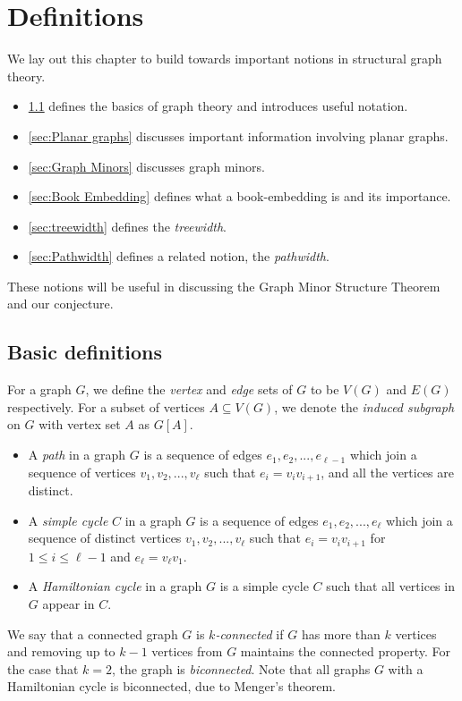\chapter{Definitions}\label{chap:Definitions}
We lay out this chapter to build towards important notions in structural graph theory.
\begin{itemize}
	\item \cref{sec: Basic definitions} defines the basics of graph theory and introduces useful notation.
	\item \cref{sec:Planar graphs} discusses important information involving planar graphs. 
	\item \cref{sec:Graph Minors} discusses graph minors.
	\item \cref{sec:Book Embedding} defines what a book-embedding is and its importance. 
	\item \cref{sec:treewidth} defines the \textit{treewidth}.
	\item \cref{sec:Pathwidth} defines a related notion, the \textit{pathwidth}.
\end{itemize}
These notions will be useful in discussing the Graph Minor Structure Theorem and our conjecture. 
\section{Basic definitions}\label{sec: Basic definitions}
For a graph $G$, we define the \textit{vertex} and \textit{edge} sets of $G$ to be $V(G)$ and $E(G)$ respectively.
For a subset of vertices $A \subseteq V(G)$, we denote the \textit{induced subgraph} on $G$ with vertex set $A$ as $G[A]$. 

\begin{itemize}
	\item A \textit{path} in a graph $G$ is a sequence of edges $e_1, e_2, ..., e_{\ell- 1}$ which join a sequence of vertices $v_1, v_2, ..., v_{\ell}$ such that $e_i = v_iv_{i + 1}$, and all the vertices are distinct. 
	\item A \textit{simple cycle} $C$ in a graph $G$ is a sequence of edges $e_1, e_2, ..., e_{\ell}$ which join a sequence of distinct vertices $v_1, v_2, ..., v_{\ell}$ such that $e_i = v_iv_{i + 1}$ for $1 \leq i \leq \ell - 1$ and $e_\ell = v_\ell v_1$. 
	\item A \textit{Hamiltonian cycle} in a graph $G$ is a simple cycle $C$ such that all vertices in $G$ appear in $C$.
\end{itemize}

We say that a connected graph $G$ is \textit{$k$-connected} if $G$ has more than $k$ vertices and removing up to $k-1$ vertices from $G$ maintains the connected property. For the case that $k = 2$, the graph is \textit{biconnected}. Note that all graphs $G$ with a Hamiltonian cycle is biconnected, due to Menger's theorem.\cite{mengerZurAllgemeinenKurventheorie1927a}


